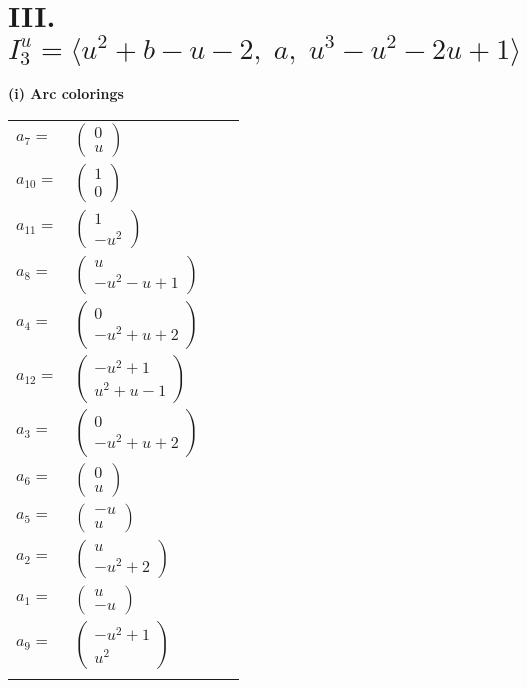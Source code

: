 \documentclass[1p]{elsarticle_modified}
\theoremstyle{definition}
\begin{document}
\centering \section*{III. $I^u_{3}= \langle u^2+b- u-2,\;a,\;u^3- u^2-2 u+1 \rangle$}
\flushleft \textbf{(i) Arc colorings}\\
\begin{tabular}{m{7pt} m{180pt} m{7pt} m{180pt} }
\flushright $a_{7}=$&$\begin{pmatrix}0\\u\end{pmatrix}$ \\
\flushright $a_{10}=$&$\begin{pmatrix}1\\0\end{pmatrix}$ \\
\flushright $a_{11}=$&$\begin{pmatrix}1\\- u^2\end{pmatrix}$ \\
\flushright $a_{8}=$&$\begin{pmatrix}u\\- u^2- u+1\end{pmatrix}$ \\
\flushright $a_{4}=$&$\begin{pmatrix}0\\- u^2+u+2\end{pmatrix}$ \\
\flushright $a_{12}=$&$\begin{pmatrix}- u^2+1\\u^2+u-1\end{pmatrix}$ \\
\flushright $a_{3}=$&$\begin{pmatrix}0\\- u^2+u+2\end{pmatrix}$ \\
\flushright $a_{6}=$&$\begin{pmatrix}0\\u\end{pmatrix}$ \\
\flushright $a_{5}=$&$\begin{pmatrix}- u\\u\end{pmatrix}$ \\
\flushright $a_{2}=$&$\begin{pmatrix}u\\- u^2+2\end{pmatrix}$ \\
\flushright $a_{1}=$&$\begin{pmatrix}u\\- u\end{pmatrix}$ \\
\flushright $a_{9}=$&$\begin{pmatrix}- u^2+1\\u^2\end{pmatrix}$\\&\end{tabular}
\end{document}

